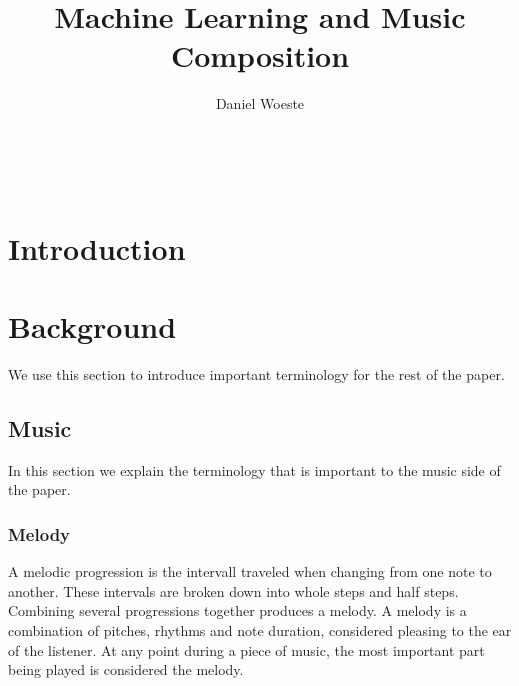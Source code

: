 \documentclass{sig-alternate}
\begin{document}

\title{Machine Learning and Music Composition}
\author{
\alignauthor
Daniel Woeste\\
	\\
	\\
	\\
}


\maketitle
\begin{abstract}

\end{abstract}


\section{Introduction}
\label{sec:introduction}

\section{Background}
\label{sec:background}
	We use this section to introduce important terminology for the rest of the paper.

\subsection{Music}
\label{sec:music}
	In this section we explain the terminology that is important to the music side of the paper.
\subsubsection{Melody}
\label{sec:melody}
A melodic progression is the intervall traveled when changing from one note to another. These intervals are broken down into whole steps and half steps. Combining several  progressions together produces a melody. A melody is a combination of pitches, rhythms and note duration, considered pleasing to the ear of the listener. At any point during a piece of music, the most important part being played is considered the melody. 
\end{document}
